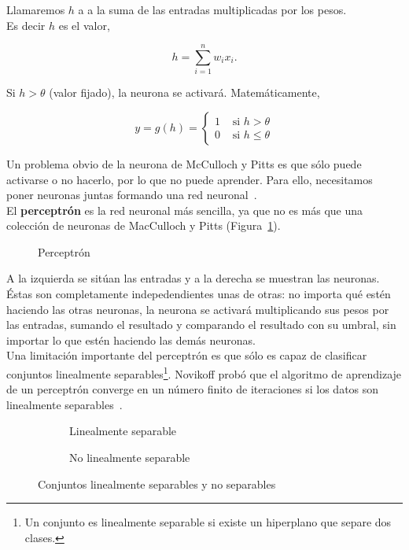 Llamaremos $h$ a a la suma de las entradas multiplicadas por los pesos.\\

Es decir $h$ es el valor,

\begin{equation}
h = \sum_{i=1}^{n} w_i x_i.
\end{equation}

Si $h > \theta$ (valor fijado), la neurona se activará. Matemáticamente,

\begin{equation}
y = g(h) =
\begin{cases}
1 & \text{ si } h > \theta \\
0 & \text{ si } h  \leq \theta
\end{cases}
\end{equation}

Un problema obvio de la neurona de McCulloch y Pitts es que sólo puede activarse o no hacerlo, por lo que no puede aprender. Para ello, necesitamos poner neuronas juntas formando una red neuronal~\cite[pág 11]{Marsland:2009:MLA:1571643}.\\

El \textbf{perceptrón} es la red neuronal más sencilla, ya que no es más que una colección de neuronas de MacCulloch y Pitts (Figura~\ref{fig:perceptron}).

\begin{figure}[htbp!]
	\centering
	\perceptron
	\caption{Perceptrón}
	\label{fig:perceptron}
\end{figure}

A la izquierda se sitúan las entradas y a la derecha se muestran las neuronas. Éstas son completamente indepedendientes unas de otras: no importa qué estén haciendo las otras neuronas, la neurona se activará multiplicando sus pesos por las entradas, sumando el resultado y comparando el resultado con su umbral, sin importar lo que estén haciendo las demás neuronas.\\

Una limitación importante del perceptrón es que sólo es capaz de clasificar conjuntos linealmente separables\footnote{Un conjunto es linealmente separable si existe un hiperplano que separe dos clases.}. Novikoff probó que el algoritmo de aprendizaje de un perceptrón converge en un número finito de iteraciones si los datos son linealmente separables~\cite{Novikoff:1962}.\\

\begin{figure}[htbp!]
	\begin{center}
		\begin{subfigure}[b]{.40\textwidth}
			\centering
			\linealmenteseparable
			\caption{Linealmente separable}
		\end{subfigure}
		\begin{subfigure}[b]{.40\textwidth}
			\centering
			\nolinealmenteseparable
			\caption{No linealmente separable}
		\end{subfigure}
		
	\end{center}
	\caption{Conjuntos linealmente separables y no separables}
	\label{fig:linealmente_separable}
\end{figure}

